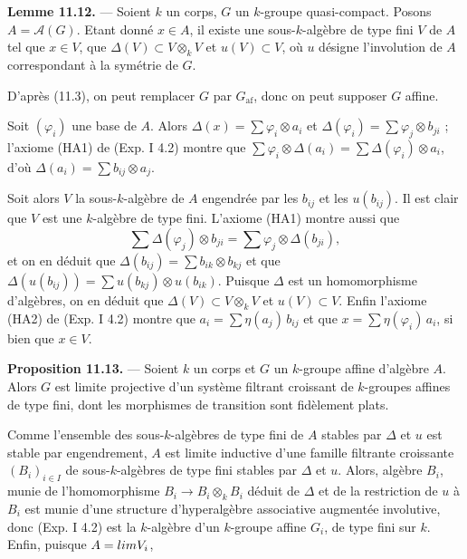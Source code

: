 \documentclass[11pt,a4paper]{article}
\begin{document}
\textbf{Lemme 11.12.} — Soient $k$ un corps, $G$ un $k$-groupe
quasi-compact. Posons $A = \mathcal{A}(G)$. Etant donné $x \in A$, il
existe  une
sous-$k$-algèbre de type fini $V$ de $A$ tel que $x \in V$, que
$\Delta(V) \subset V \otimes_{k} V$ et $u(V) \subset V$, où $u$ désigne
l'involution de $A$ correspondant à la symétrie de $G$.

D'après (11.3), on peut remplacer $G$ par $G_{\mathrm{af}}$, donc on peut
supposer $G$ affine.

Soit $(\varphi_{i})$ une base de $A$. Alors
$\Delta(x) = \sum \varphi_{i} \otimes a_{i}$ et
$\Delta(\varphi_{i}) = \sum \varphi_{j} \otimes b_{ji}$ ; l'axiome (HA1) de
(Exp. I 4.2) montre que
$\sum \varphi_{i} \otimes \Delta(a_{i})
= \sum \Delta(\varphi_{i}) \otimes a_{i}$, d'où
$\Delta(a_{i}) = \sum b_{ij} \otimes a_{j}$.

Soit alors $V$ la  sous-$k$-algèbre de $A$
engendrée par les $b_{ij}$ et les $u(b_{ij})$. Il est clair que $V$ est une
$k$-algèbre de type fini. L'axiome (HA1) montre aussi que
\[
\sum \Delta(\varphi_{j}) \otimes b_{ji}
= \sum \varphi_{j} \otimes \Delta(b_{ji}) ,
\]
et on en déduit que $\Delta(b_{ij}) = \sum b_{ik} \otimes b_{kj}$ et que
$\Delta(u(b_{ij})) = \sum u(b_{kj}) \otimes u(b_{ik})$. Puisque $\Delta$
est un homomorphisme d'algèbres, on en déduit que
$\Delta(V) \subset V \otimes_{k} V$ et $u(V) \subset V$. Enfin l'axiome
(HA2) de (Exp. I 4.2) montre que $a_{i} = \sum \eta(a_{j})\, b_{ij}$ et que
$x = \sum \eta(\varphi_{i})\, a_{i}$, si bien que $x \in V$.

\textbf{Proposition 11.13.} — \struck{\ill{}} Soient $k$ un corps et $G$ un
$k$-groupe affine d'algèbre $A$. Alors $G$ est limite projective d'un
système filtrant croissant de $k$-groupes affines de type fini, dont les
morphismes de transition sont fidèlement plats.

Comme l'ensemble des sous-$k$-algèbres de type fini de $A$ stables par
$\Delta$ et $u$ est stable par engendrement, $A$ est limite inductive d'une
famille filtrante croissante $(B_{i})_{i \in I}$ de sous-$k$-algèbres de
type fini stables par $\Delta$ et $u$. Alors,  algèbre
$B_{i}$, munie de l'homomorphisme
$B_{i} \longrightarrow B_{i} \otimes_{k} B_{i}$ déduit de $\Delta$ et de la
restriction de $u$ à $B_{i}$ est munie d'une structure d'hyperalgèbre
associative augmentée involutive, donc (Exp. I 4.2) est la $k$-algèbre d'un
$k$-groupe affine $G_{i}$, de type fini sur $k$. Enfin, puisque
$A = \varinjlim V_{i}$,
\end{document}
